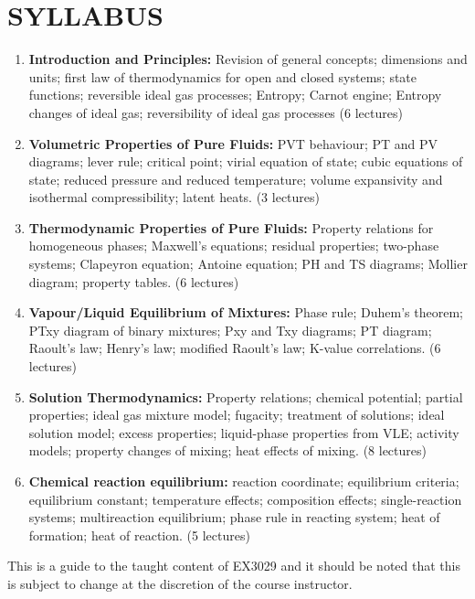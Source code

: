 \documentclass[12pts,a4paper,amsmath,amssymb,floatfix]{article}%
\begin{document}
\section{SYLLABUS}
\begin{enumerate}[{\bf 1.}]
\item {\bf Introduction and Principles:} Revision of general concepts; dimensions and units; first law of thermodynamics for open and closed systems; state functions; reversible ideal gas processes; Entropy; Carnot engine; Entropy changes of ideal gas; reversibility of ideal gas processes  (6 lectures)
\item {\bf Volumetric Properties of Pure Fluids:} PVT behaviour; PT and PV diagrams; lever rule; critical point; virial equation of state; cubic equations of state; reduced pressure and reduced temperature; volume expansivity and isothermal compressibility; latent heats.  (3 lectures)
\item {\bf Thermodynamic Properties of Pure Fluids:} Property relations for homogeneous phases; Maxwell's equations; residual properties; two-phase systems; Clapeyron equation; Antoine equation; PH and TS diagrams; Mollier diagram; property tables.  (6 lectures)
\item {\bf Vapour/Liquid Equilibrium of Mixtures:} Phase rule; Duhem’s theorem; PTxy diagram of binary mixtures; Pxy and Txy diagrams; PT diagram; Raoult's law; Henry's law; modified Raoult's law; K-value correlations.  (6 lectures)
\item {\bf Solution Thermodynamics:} Property relations; chemical potential; partial properties; ideal gas mixture model; fugacity; treatment of solutions; ideal solution model; excess properties; liquid-phase properties from VLE; activity models; property changes of mixing; heat effects of mixing.  (8 lectures)
\item {\bf Chemical reaction equilibrium:} reaction coordinate; equilibrium criteria; equilibrium constant; temperature effects; composition effects; single-reaction systems; multireaction equilibrium; phase rule in reacting system; heat of formation; heat of reaction.  (5 lectures)
\end{enumerate}

\medskip
This is a guide to the taught content of EX3029 and it should be noted that this is subject to change at the discretion of the course instructor.
\end{document}
